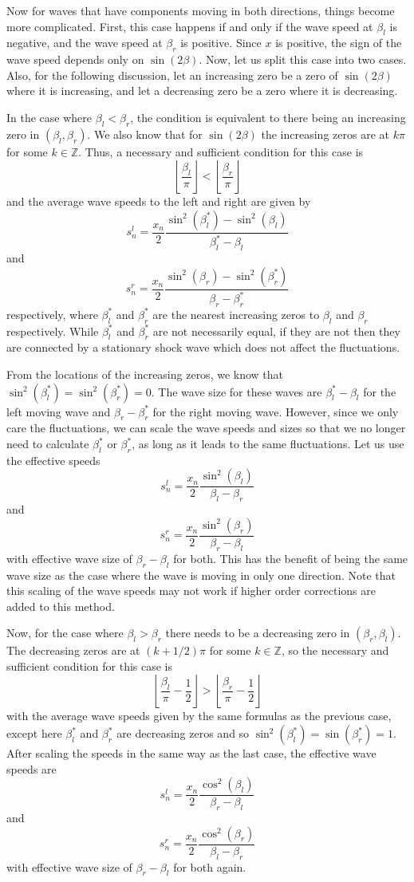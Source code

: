 \documentclass[12pt]{article}
\begin{document}
Now for waves that have components moving in both directions, things become more
complicated. First, this case happens if and only if the wave speed at $\beta_l$ is
negative, and the wave speed at $\beta_r$ is positive. Since $x$ is positive, the sign
of the wave speed depends only on $\sin(2\beta)$. Now, let us split this case into two
cases. Also, for the following discussion, let an increasing zero be a zero of
$\sin(2\beta)$ where it is increasing, and let a decreasing zero be a zero where it is
decreasing.

In the case where $\beta_l < \beta_r$, the condition is equivalent to there being an
increasing zero in $(\beta_l,\beta_r)$. We also know that for $\sin(2\beta)$ the
increasing zeros are at $k\pi$ for some $k\in\mathbb{Z}$. Thus, a necessary and
sufficient condition for this case is
\[ \left\lfloor \frac{\beta_l}{\pi} \right\rfloor < \left\lfloor \frac{\beta_r}{\pi}
\right\rfloor \]
and the average wave speeds to the left and right are given by
\[ s_n^l = \frac{x_n}{2} \frac{\sin^2(\beta_l^*) - \sin^2(\beta_l)}{\beta_l^* - \beta_l}
\]
and
\[ s_n^r = \frac{x_n}{2} \frac{\sin^2(\beta_r) - \sin^2(\beta_r^*)}{\beta_r - \beta_r^*}
\]
respectively, where $\beta_l^*$ and $\beta_r^*$ are the nearest increasing zeros to
$\beta_l$ and $\beta_r$ respectively. While $\beta_l^*$ and $\beta_r^*$ are not
necessarily equal, if they are not then they are connected by a stationary shock wave
which does not affect the fluctuations.

From the locations of the increasing zeros, we know that $\sin^2(\beta_l^*) =
\sin^2(\beta_r^*) = 0$. The wave size for these waves are $\beta_l^* - \beta_l$ for the
left moving wave and $\beta_r - \beta_r^*$ for the right moving wave. However, since we
only care the fluctuations, we can scale the wave speeds and sizes so that we no longer
need to calculate $\beta_l^*$ or $\beta_r^*$, as long as it leads to the same
fluctuations. Let us use the effective speeds
\[ s_n^l = \frac{x_n}{2} \frac{\sin^2(\beta_l)}{\beta_l - \beta_r} \]
and
\[ s_n^r = \frac{x_n}{2} \frac{\sin^2(\beta_r)}{\beta_r - \beta_l} \]
with effective wave size of $\beta_r - \beta_l$ for both. This has the benefit of being
the same wave size as the case where the wave is moving in only one direction. Note that
this scaling of the wave speeds may not work if higher order corrections are added to
this method.

Now, for the case where $\beta_l > \beta_r$ there needs to be a decreasing zero in
$(\beta_r,\beta_l)$. The decreasing zeros are at $(k + 1/2)\pi$ for some
$k\in\mathbb{Z}$, so the necessary and sufficient condition for this case is
\[ \left\lfloor \frac{\beta_l}{\pi} - \frac{1}{2} \right\rfloor  > \left\lfloor
\frac{\beta_r}{\pi} - \frac{1}{2} \right\rfloor \]
with the average wave speeds given by the same formulas as the previous case, except
here $\beta_l^*$ and $\beta_r^*$ are decreasing zeros and so $\sin^2(\beta_l^*) =
\sin(\beta_r^*) = 1$. After scaling the speeds in the same way as the last case, the
effective wave speeds are
\[ s_n^l = \frac{x_n}{2} \frac{\cos^2(\beta_l)}{\beta_r - \beta_l} \]
and
\[ s_n^r = \frac{x_n}{2} \frac{\cos^2(\beta_r)}{\beta_l - \beta_r} \]
with effective wave size of $\beta_r - \beta_l$ for both again.
\end{document}
